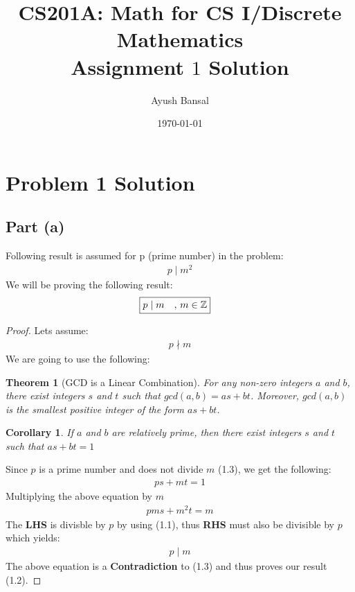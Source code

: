 \documentclass{article}
\title{\vspace{80mm}\lightgreyb CS201A: Math for CS I/Discrete Mathematics \\
\lightgreyb Assignment $1$ Solution}
\author{Ayush Bansal}
\date{\today}
\newtheorem{theorem}{Theorem}
\newtheorem{corollary}{Corollary}[theorem]
\begin{document}
\clearpage\maketitle
\thispagestyle{empty}
\newpage
\setcounter{page}{1}
\section{Problem 1 Solution}{
    \subsection{Part (a)}{
        Following result is assumed for p (prime number) in the problem:
        \begin{align}
          p \mid m^2 \label{eq:1}
        \end{align}
        We will be proving the following result:
        \begin{align}
          \Aboxed{p \mid m \quad,\, m \in \mathbb{Z}} \label{eq:2}
        \end{align}
        \begin{proof}
          Lets assume:
          \begin{align}
            p \nmid m \label{eq:3}
          \end{align}
          We are going to use the following:
          \begin{theorem}[GCD is a Linear Combination]
          For any non-zero integers $a$ and $b$, there exist integers $s$ and $t$ such that $gcd(a,b)=as+bt$. Moreover, $gcd(a,b)$ is the smallest positive integer of the form $as+bt$.
        \end{theorem}
          \begin{corollary}
          If $a$ and $b$ are relatively prime, then there exist integers $s$ and $t$ such that $as+bt=1$
        \end{corollary}
          Since $p$ is a prime number and does not divide $m$ (1.3), we get the following:
          \begin{align*}
            ps+mt=1 \label{eq:4}
          \end{align*}
          Multiplying the above equation by $m$
          \begin{align*}
            pms+m^2t=m
          \end{align*}
          The \textbf{LHS} is divisble by $p$ by using (1.1), thus \textbf{RHS} must also be divisible by $p$ which yields:
          \begin{align*}
            p \mid m
          \end{align*}
          The above equation is a \textbf{Contradiction} to (1.3) and thus proves our result (1.2).
        \end{proof}
    }
}
\end{document}
